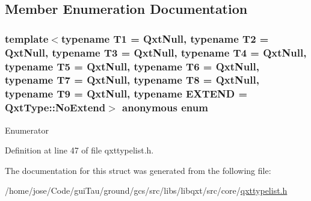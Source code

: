\subsection{Member Enumeration Documentation}
\hypertarget{struct_qxt_type_1_1_qxt_type_list_a361a0270ee620e3254cff4d44b1257ee}{\subsubsection[{anonymous enum}]{\setlength{\rightskip}{0pt plus 5cm}template$<$typename T1  = Qxt\-Null, typename T2  = Qxt\-Null, typename T3  = Qxt\-Null, typename T4  = Qxt\-Null, typename T5  = Qxt\-Null, typename T6  = Qxt\-Null, typename T7  = Qxt\-Null, typename T8  = Qxt\-Null, typename T9  = Qxt\-Null, typename E\-X\-T\-E\-N\-D  = Qxt\-Type\-::\-No\-Extend$>$ anonymous enum}}\label{struct_qxt_type_1_1_qxt_type_list_a361a0270ee620e3254cff4d44b1257ee}
\begin{Desc}
\item[Enumerator]\par
\begin{description}
\item[{\em 
\hypertarget{struct_qxt_type_1_1_qxt_type_list_a361a0270ee620e3254cff4d44b1257eea0ece857538d32b4c389bd949fa3b4ab5}{length}\label{struct_qxt_type_1_1_qxt_type_list_a361a0270ee620e3254cff4d44b1257eea0ece857538d32b4c389bd949fa3b4ab5}
}]\item[{\em 
\hypertarget{struct_qxt_type_1_1_qxt_type_list_a361a0270ee620e3254cff4d44b1257eeac060a2fd27c392b65da3ba4654a37c86}{extends}\label{struct_qxt_type_1_1_qxt_type_list_a361a0270ee620e3254cff4d44b1257eeac060a2fd27c392b65da3ba4654a37c86}
}]\end{description}
\end{Desc}


Definition at line 47 of file qxttypelist.\-h.



The documentation for this struct was generated from the following file\-:\begin{DoxyCompactItemize}
\item 
/home/jose/\-Code/gui\-Tau/ground/gcs/src/libs/libqxt/src/core/\hyperlink{qxttypelist_8h}{qxttypelist.\-h}\end{DoxyCompactItemize}
